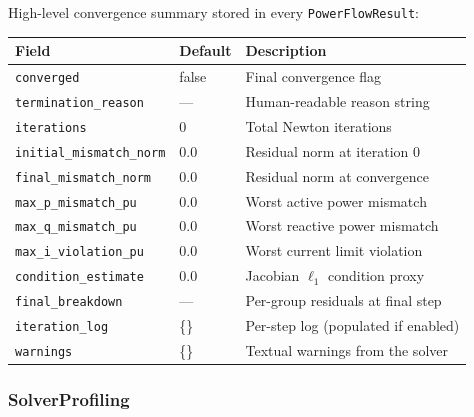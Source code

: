 High-level convergence summary stored in every \texttt{PowerFlowResult}:
\begin{longtable}{lll}
\hline\hline
\textbf{Field} & \textbf{Default} & \textbf{Description} \\
\hline\endhead\hline\endfoot
\texttt{converged} & false & Final convergence flag \\
\texttt{termination\_reason} & --- & Human-readable reason string \\
\texttt{iterations} & 0 & Total Newton iterations \\
\texttt{initial\_mismatch\_norm} & 0.0 & Residual norm at iteration 0 \\
\texttt{final\_mismatch\_norm} & 0.0 & Residual norm at convergence \\
\texttt{max\_p\_mismatch\_pu} & 0.0 & Worst active power mismatch \\
\texttt{max\_q\_mismatch\_pu} & 0.0 & Worst reactive power mismatch \\
\texttt{max\_i\_violation\_pu} & 0.0 & Worst current limit violation \\
\texttt{condition\_estimate} & 0.0 & Jacobian $\ell_1$ condition proxy \\
\texttt{final\_breakdown} & --- & Per-group residuals at final step \\
\texttt{iteration\_log} & \{\} & Per-step log (populated if enabled) \\
\texttt{warnings} & \{\} & Textual warnings from the solver \\
\end{longtable}

\subsubsection{SolverProfiling}

